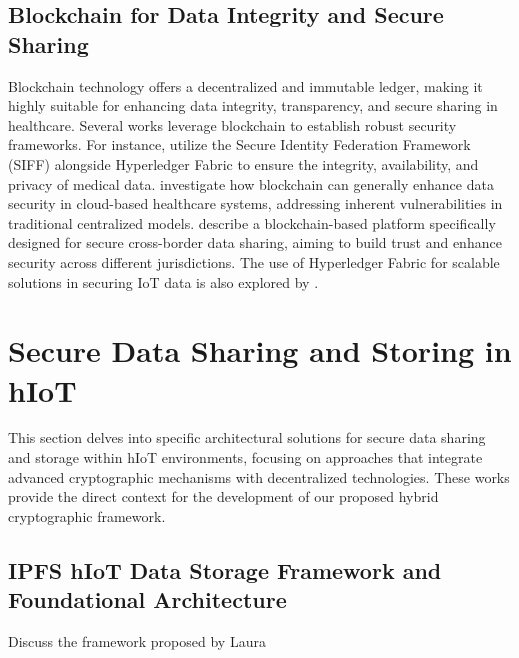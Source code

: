 \documentclass[cic,tc,english]{iiufrgs}
\begin{document}
        \subsection{Blockchain for Data Integrity and Secure Sharing}
            Blockchain technology offers a decentralized and immutable ledger, making it highly suitable for enhancing data integrity, transparency, and secure sharing in healthcare. Several works leverage blockchain to establish robust security frameworks. For instance, \citet{Tian2019} utilize the Secure Identity Federation Framework (SIFF) alongside Hyperledger Fabric to ensure the integrity, availability, and privacy of medical data. \citet{Esposito2018} investigate how blockchain can generally enhance data security in cloud-based healthcare systems, addressing inherent vulnerabilities in traditional centralized models. \citet{Rahman2020} describe a blockchain-based platform specifically designed for secure cross-border data sharing, aiming to build trust and enhance security across different jurisdictions. The use of Hyperledger Fabric for scalable solutions in securing IoT data is also explored by \citet{Eghmazi2024}.
    

    \section{Secure Data Sharing and Storing in hIoT}
        \label{sec:securedata}
        This section delves into specific architectural solutions for secure data sharing and storage within hIoT environments, focusing on approaches that integrate advanced cryptographic mechanisms with decentralized technologies. These works provide the direct context for the development of our proposed hybrid cryptographic framework.

        \subsection{IPFS hIoT Data Storage Framework and Foundational Architecture}
            \begin{draft}{Discuss the framework proposed by Laura}
            \end{draft}
\end{document}

